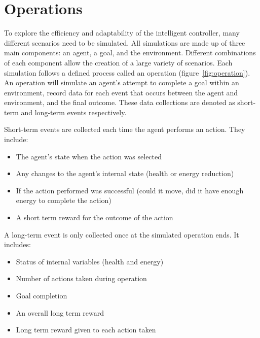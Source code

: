 \section{Operations} \label{sec:operations}
To explore the efficiency and adaptability of the intelligent controller, many different scenarios need to be simulated.
All simulations are made up of three main components: an agent, a goal, and the environment.
Different combinations of each component allow the creation of a large variety of scenarios.
Each simulation follows a defined process called an operation (figure~\ref{fig:operation}).
An operation will simulate an agent's attempt to complete a goal within an environment, record data for each event that occurs between the agent and environment, and the final outcome.
These data collections are denoted as short-term and long-term events respectively.

\noindent
Short-term events are collected each time the agent performs an action.
They include:

\begin{itemize}
  \item The agent's state when the action was selected
  \item Any changes to the agent's internal state (health or energy reduction)
  \item If the action performed was successful (could it move, did it have enough energy to complete the action)
  \item A short term reward for the outcome of the action
\end{itemize}

\noindent
A long-term event is only collected once at the simulated operation ends.
It includes:

\begin{itemize}
  \item Status of internal variables (health and energy)
  \item Number of actions taken during operation
  \item Goal completion
  \item An overall long term reward
  \item Long term reward given to each action taken
\end{itemize}

